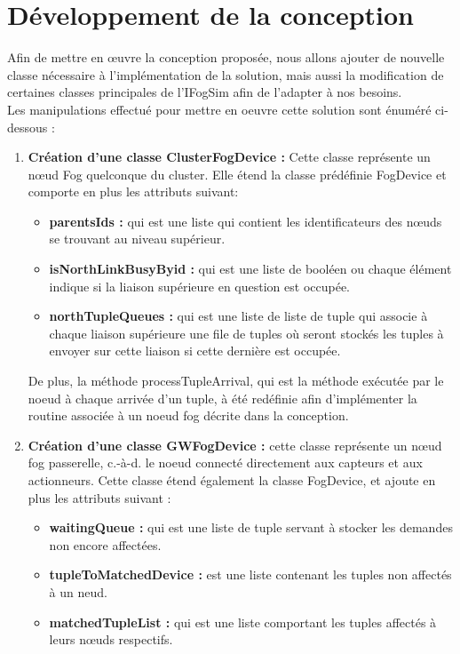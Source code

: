 \section{Développement de la conception}
Afin de mettre en œuvre la conception proposée, nous allons ajouter de nouvelle classe nécessaire à l’implémentation de la solution, mais aussi la modification de certaines classes principales de l’IFogSim afin de l’adapter à nos besoins.\\
Les manipulations effectué pour mettre en oeuvre cette solution sont énuméré ci-dessous : 
\begin{enumerate}
    \item \textbf{Création d’une classe ClusterFogDevice :} Cette classe représente un nœud Fog quelconque du cluster. Elle étend la classe prédéfinie FogDevice et comporte en plus les attributs suivant:
\begin{itemize}
    \item \textbf{parentsIds :} qui est une liste qui contient les identificateurs des nœuds se trouvant au niveau supérieur.
    \item \textbf{isNorthLinkBusyByid :} qui est une liste de booléen ou chaque élément indique si la liaison supérieure en question est occupée.
    \item \textbf{northTupleQueues :} qui est une liste de liste de tuple qui associe à chaque liaison supérieure une file de tuples où seront stockés les tuples à envoyer sur cette liaison si cette dernière est occupée.
\end{itemize}
De plus, la méthode  processTupleArrival, qui est la méthode exécutée par le noeud à  chaque arrivée d’un tuple, à été redéfinie afin d’implémenter la routine associée à un noeud fog décrite dans la conception.
     \item \textbf{Création d’une classe GWFogDevice :} cette classe représente un nœud fog passerelle, c.-à-d. le noeud connecté directement aux capteurs et aux actionneurs. Cette classe étend également la classe FogDevice, et ajoute en plus les attributs suivant :
     \begin{itemize}
     \item \textbf{waitingQueue :} qui est une liste de tuple servant à stocker les demandes non encore affectées.
     \item \textbf{tupleToMatchedDevice :} est une liste contenant les tuples non affectés à un neud.
     \item \textbf{matchedTupleList :} qui est une liste comportant les tuples affectés à leurs nœuds respectifs.

\end{itemize}
\end{enumerate}
